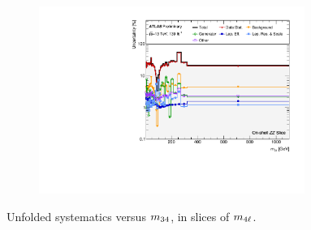 \begin{figure}[hp]
    \begin{subfigure}{.49\textwidth}\centering\includegraphics[width = 0.95\textwidth]{Figures/m4l/Systematics/Unfolded/UnfoldedSys_m34_vs_M4l_Stack_Paper3.pdf}\end{subfigure}
    \caption{Unfolded systematics versus $m_{34}$, in slices of $m_{4\ell}$.}
\end{figure}

